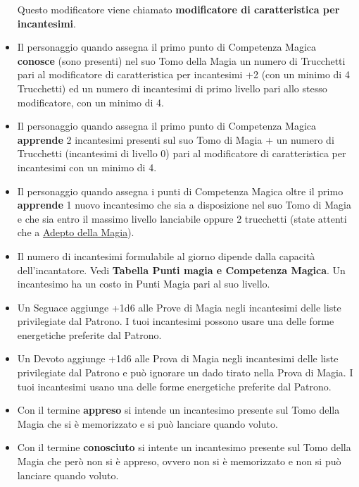 \begin{multicols}{2}
\begin{itemize}[leftmargin=*]
Questo modificatore viene chiamato \textbf{modificatore di caratteristica per incantesimi}.
\item
Il personaggio quando assegna il primo punto di Competenza Magica \textbf{conosce} (sono presenti) nel suo Tomo della Magia un numero di Trucchetti pari al modificatore di caratteristica per incantesimi +2 (con un minimo di 4 Trucchetti) ed un numero di incantesimi di primo livello pari allo stesso modificatore, con un minimo di 4.
\item
Il personaggio quando assegna il primo punto di Competenza Magica \textbf{apprende} 2 incantesimi presenti sul suo Tomo di Magia + un numero di Trucchetti (incantesimi di livello 0) pari al modificatore di caratteristica per incantesimi con un minimo di 4.\label{incantesimicm1}\hypertarget{incantesimicm1}{}
\item
Il personaggio quando assegna i punti di Competenza Magica oltre il primo \textbf{apprende} 1 nuovo incantesimo che sia a disposizione nel suo Tomo di Magia e che sia entro il massimo livello lanciabile oppure 2 trucchetti (state attenti che a \hyperlink{adeptodellamagia}{Adepto della Magia}).
\item
Il numero di incantesimi formulabile al giorno dipende dalla capacità dell'incantatore. Vedi \textbf{Tabella Punti magia e Competenza Magica}. Un incantesimo ha un costo in Punti Magia pari al suo livello.
\item
Un Seguace aggiunge +1d6 alle Prove di Magia negli incantesimi delle liste privilegiate dal Patrono. I tuoi incantesimi possono usare una delle forme energetiche preferite dal Patrono.\label{listeprivilegiate}\hypertarget{listeprivilegiate}{}
\item
Un Devoto aggiunge +1d6 alle Prova di Magia negli incantesimi delle liste privilegiate dal Patrono e può ignorare un dado tirato nella Prova di Magia. I tuoi incantesimi usano una delle forme energetiche preferite dal Patrono.
\item
Con il termine \textbf{appreso} si intende un incantesimo presente sul Tomo della Magia che si è memorizzato e si può lanciare quando voluto.
\item 
Con il termine \textbf{conosciuto} si intente un incantesimo presente sul Tomo della Magia che però non si è appreso, ovvero non si è memorizzato e non si può lanciare quando voluto.
\end{itemize}

\end{multicols}


